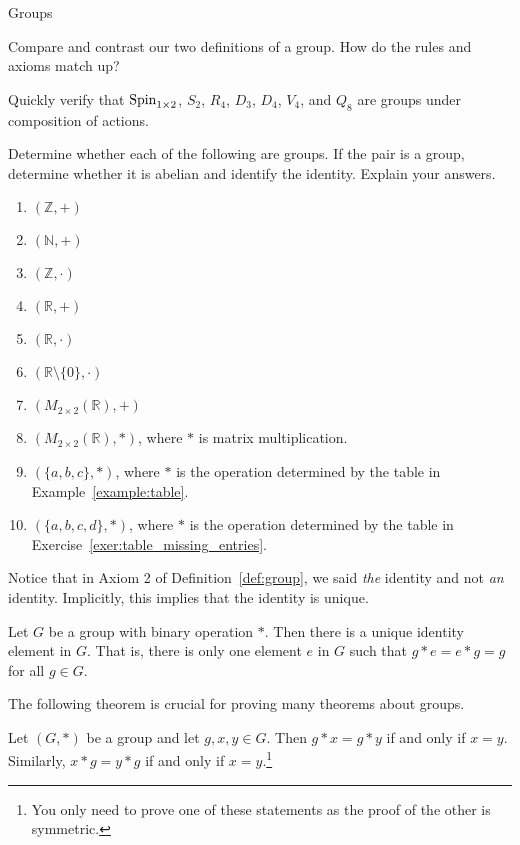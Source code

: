 \begin{section}{Groups}
\begin{exercise}
Compare and contrast our two definitions of a group.  How do the rules and axioms match up?
\end{exercise}

\begin{exercise}
Quickly verify that $\operatorname{Spin}_{1\times 2}$, $S_2$, $R_4$, $D_3$, $D_4$, $V_4$, and $Q_8$ are groups under composition of actions.
\end{exercise}

\begin{exercise}
Determine whether each of the following are groups.  If the pair is a group, determine whether it is abelian and identify the identity.  Explain your answers.
\begin{enumerate}[label=\rm{(\alph*)}]
\item $(\mathbb{Z},+)$
\item $(\mathbb{N},+)$
\item $(\mathbb{Z},\cdot)$
\item $(\mathbb{R},+)$
\item $(\mathbb{R},\cdot)$
\item $(\mathbb{R}\setminus \{0\},\cdot)$
\item $(M_{2\times 2}(\mathbb{R}),+)$
\item $(M_{2\times 2}(\mathbb{R}),*)$, where $*$ is matrix multiplication.
\item $(\{a,b,c\},*)$, where $*$ is the operation determined by the table in Example~\ref{example:table}.
\item $(\{a,b,c,d\},*)$, where $*$ is the operation determined by the table in Exercise~\ref{exer:table_missing_entries}.
\end{enumerate}
\end{exercise}

Notice that in Axiom 2 of Definition~\ref{def:group}, we said \emph{the} identity and not \emph{an} identity.  Implicitly, this implies that the identity is unique.

\begin{theorem}\label{thm:unique_id}
Let $G$ be a group with binary operation $*$.  Then there is a unique identity element in $G$.  That is, there is only one element $e$ in $G$ such that $g*e=e*g=g$ for all $g\in G$.
\end{theorem}

The following theorem is crucial for proving many theorems about groups.

\begin{theorem}
Let $(G,*)$ be a group and let $g,x,y\in G$.  Then $g*x=g*y$ if and only if $x=y$.  Similarly, $x*g=y*g$ if and only if $x=y$.\footnote{You only need to prove one of these statements as the proof of the other is symmetric.}
\end{theorem}


\end{section}

